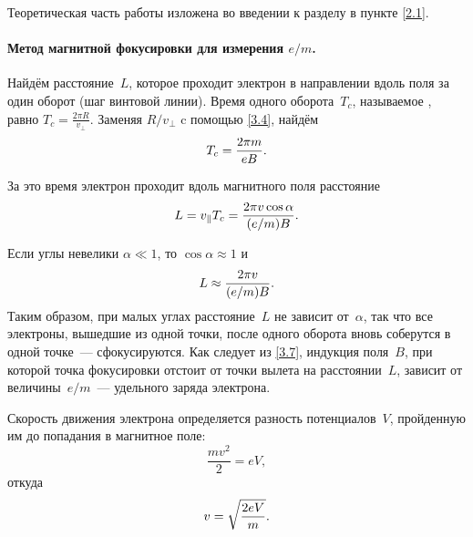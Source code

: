 



Теоретическая часть работы изложена во введении к разделу в пункте \ref{2.1}.

\paragraph{Метод магнитной фокусировки для измерения $e/m$.}
Найдём расстояние~$L$, которое проходит электрон в направлении вдоль поля за
один
оборот (шаг винтовой линии). Время одного оборота~$T_c$,
называемое , равно
$T_c= \frac{2\pi R}{v_{\perp}}$. Заменяя $R/v_{\perp}$ c помощью \eqref{3.4},
найдём
\begin{equation}
    \eqmark{3.5}
    T_c =\frac{2\pi m}{eB}.
\end{equation}

За это время электрон проходит вдоль магнитного поля расстояние
\begin{equation}
    \eqmark{3.6}
    L = v_{\parallel}T_c =\frac{2\pi v\cos\alpha}{(e/m)B}.
\end{equation}

Если углы невелики $\alpha \ll 1$, то $\cos\alpha \approx 1$ и
\begin{equation}
    \eqmark{3.7}
    L \approx \frac{2\pi v}{(e/m)B}.
\end{equation}
Таким образом, при малых углах расстояние~$L$ не зависит от~$\alpha$, так
что все электроны, вышедшие из одной точки, после одного оборота вновь соберутся
в одной точке~--- сфокусируются. Как следует из \eqref{3.7}, индукция поля~$B$,
при которой точка фокусировки отстоит от точки вылета на расстоянии~$L$, зависит
от величины~$e/m$~--- удельного заряда электрона.

Скорость движения электрона определяется разность потенциалов~$V$,
пройденную им до попадания в магнитное поле:
\begin{equation*}
  \frac{mv^2}{2}=eV,
\end{equation*}
откуда
\begin{equation}
  \eqmark{3.3}
  v=\sqrt{\frac{2eV}{m}}.
\end{equation}

